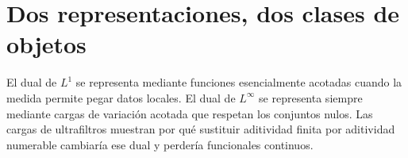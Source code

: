 \section{Dos representaciones, dos clases de objetos}
El dual de $L^1$ se representa mediante funciones esencialmente acotadas cuando la medida permite pegar datos locales. El dual de $L^\infty$ se representa siempre mediante cargas de variación acotada que respetan los conjuntos nulos. Las cargas de ultrafiltros muestran por qué sustituir aditividad finita por aditividad numerable cambiaría ese dual y perdería funcionales continuos.
